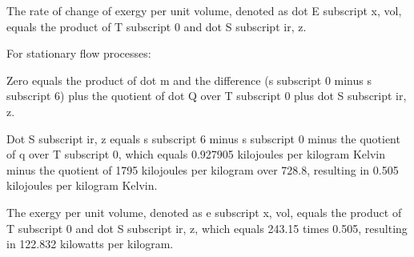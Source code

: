 The rate of change of exergy per unit volume, denoted as dot E subscript x, vol, equals the product of T subscript 0 and dot S subscript ir, z.

For stationary flow processes:

Zero equals the product of dot m and the difference (s subscript 0 minus s subscript 6) plus the quotient of dot Q over T subscript 0 plus dot S subscript ir, z.

Dot S subscript ir, z equals s subscript 6 minus s subscript 0 minus the quotient of q over T subscript 0, which equals 0.927905 kilojoules per kilogram Kelvin minus the quotient of 1795 kilojoules per kilogram over 728.8, resulting in 0.505 kilojoules per kilogram Kelvin.

The exergy per unit volume, denoted as e subscript x, vol, equals the product of T subscript 0 and dot S subscript ir, z, which equals 243.15 times 0.505, resulting in 122.832 kilowatts per kilogram.